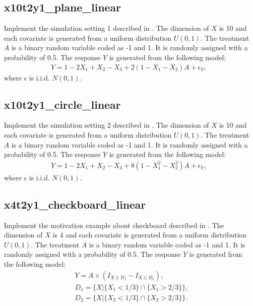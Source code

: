 \documentclass[12pt]{article}
\begin{document}
\subsection*{x10t2y1\_plane\_linear}
Implement the simulation setting 1 described in \cite{wang2018learning}. The dimension of $X$ is 10 and each covariate is generated from a uniform distribution $U(0,1)$. The treatment $A$ is a binary random variable coded as -1 and 1. It is randomly assigned with a probability of 0.5. The response $Y$ is generated from the following model: 
\begin{align*}
Y = 1 -2X_1 + X_2 -X_3 + 2(1-X_1-X_2)A + \epsilon_Y,
\end{align*}
where $\epsilon$ is i.i.d. $N(0,1)$.

\subsection*{x10t2y1\_circle\_linear}
Implement the simulation setting 2 described in \cite{wang2018learning}. The dimension of $X$ is 10 and each covariate is generated from a uniform distribution $U(0,1)$. The treatment $A$ is a binary random variable coded as -1 and 1. It is randomly assigned with a probability of 0.5. The response $Y$ is generated from the following model: 
\begin{align*}
Y = 1 -2X_1 + X_2 -X_3 + 8(1-X_1^2-X_2^2)A + \epsilon_Y,
\end{align*}
where $\epsilon$ is i.i.d. $N(0,1)$.


\subsection*{x4t2y1\_checkboard\_linear}
Implement the motivation example about checkboard described in \cite{zhu2015reinforcement}. The dimension of $X$ is 4 and each covariate is generated from a uniform distribution $U(0,1)$. The treatment $A$ is a binary random variable coded as -1 and 1. It is randomly assigned with a probability of 0.5. The response $Y$ is generated from the following model: 
\begin{align*}
&Y = A\times (I_{X\in D_1}-I_{X\in D_1}) , \\
&D_1 = \big\{X|\{X_1<1/3\}\cap\{ X_1>2/3\} \big\}, \\
&D_2 = \big\{X|\{X_2<1/3\} \cap \{X_2>2/3\} \big\}.
\end{align*}
\end{document}
